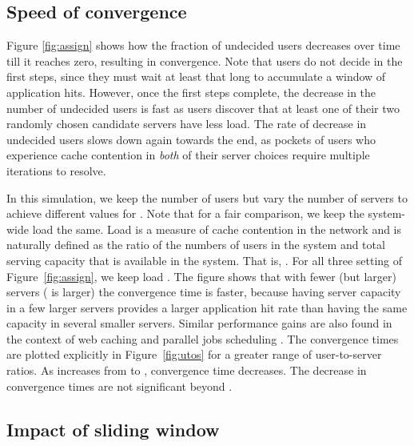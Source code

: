 \documentclass[conference]{IEEEtran}
\begin{document}
\subsection{Speed of convergence}



Figure \ref{fig:assign} shows how the fraction of undecided users decreases over time till it reaches zero, resulting in convergence. Note that users do not decide in the first  steps, since they must wait at least that long to accumulate a window of  application hits. However, once the first  steps complete,  the decrease in the number of undecided users is fast as users discover that at least one of their two randomly chosen candidate servers have less load. The rate of decrease in undecided users slows down again towards the end, as pockets of users who experience cache contention in {\em both} of their server choices require multiple iterations to resolve.

In this simulation, we keep the number of users  but vary the number of servers  to achieve different values for . Note that for a fair comparison, we keep the system-wide load  the same.  Load  is a measure of cache contention in the network and is naturally defined as the ratio of the numbers of users in the system and total serving capacity that is available in the system. That is, .
For all three setting of Figure~\ref{fig:assign}, we keep load . The figure shows that with fewer (but larger) servers ( is larger) the convergence time is faster, because having server capacity in a few larger servers provides a larger application hit rate than having the same capacity in several smaller servers. Similar performance gains are also found in the context of web caching and parallel jobs scheduling \cite{Sparrow}. The convergence times are plotted explicitly in 
Figure~\ref{fig:utos} for a greater range of  user-to-server ratios. As  increases from  to , convergence time decreases. The decrease in convergence times are not significant beyond .

\subsection{Impact of sliding window }
\end{document}
